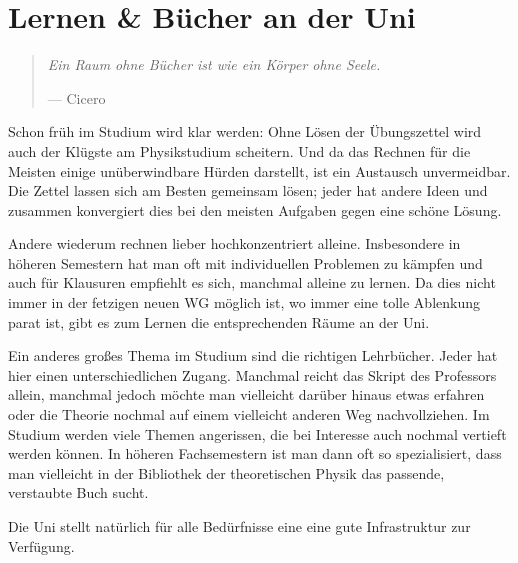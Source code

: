 \section{Lernen \& Bücher an der Uni}
\begin{multicols}{2}
\begin{quote}
\textit{Ein Raum ohne Bücher ist wie ein Körper ohne Seele.}

\hfill--- Cicero
\end{quote}
Schon früh im Studium wird klar werden: Ohne Lösen der Übungszettel wird auch der Klügste am Physikstudium scheitern. Und da das Rechnen für die Meisten einige unüberwindbare Hürden darstellt, ist ein Austausch unvermeidbar. Die Zettel lassen sich am Besten gemeinsam lösen; jeder hat andere Ideen und zusammen konvergiert dies bei den meisten Aufgaben gegen eine schöne Lösung.

Andere wiederum rechnen lieber hochkonzentriert alleine. Insbesondere in höheren Semestern hat man oft mit individuellen Problemen zu kämpfen und auch für Klausuren empfiehlt es sich, manchmal alleine zu lernen. Da dies nicht immer in der fetzigen neuen WG möglich ist, wo immer eine tolle Ablenkung parat ist, gibt es zum Lernen die entsprechenden Räume an der Uni.


Ein anderes großes Thema im Studium sind die richtigen Lehrbücher. Jeder hat hier einen unterschiedlichen Zugang. Manchmal reicht das Skript des Professors allein, manchmal jedoch möchte man vielleicht darüber hinaus etwas erfahren oder die Theorie nochmal auf einem vielleicht anderen Weg nachvollziehen. Im Studium werden viele Themen angerissen, die bei Interesse auch nochmal vertieft werden können. In höheren Fachsemestern ist man dann oft so spezialisiert, dass man vielleicht in der Bibliothek der theoretischen Physik das passende, verstaubte Buch sucht.

Die Uni stellt natürlich für alle Bedürfnisse eine eine gute Infrastruktur zur Verfügung.



\end{multicols}
